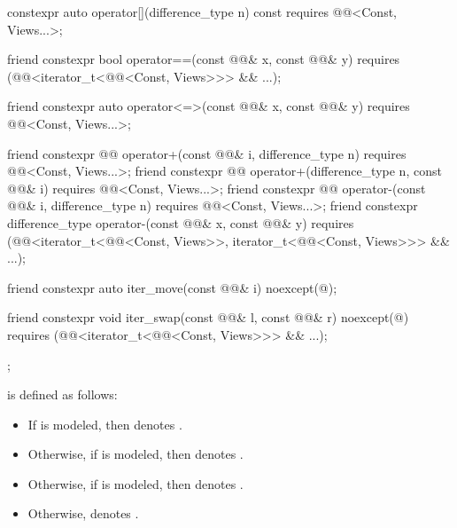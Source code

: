 \begin{codeblock}
{{    constexpr auto operator[](difference_type n) const
      requires @@<Const, Views...>;

    friend constexpr bool operator==(const @@& x, const @@& y)
      requires (@@<iterator_t<@@<Const, Views>>> && ...);

    friend constexpr auto operator<=>(const @@& x, const @@& y)
      requires @@<Const, Views...>;

    friend constexpr @@ operator+(const @@& i, difference_type n)
      requires @@<Const, Views...>;
    friend constexpr @@ operator+(difference_type n, const @@& i)
      requires @@<Const, Views...>;
    friend constexpr @@ operator-(const @@& i, difference_type n)
      requires @@<Const, Views...>;
    friend constexpr difference_type operator-(const @@& x, const @@& y)
      requires (@@<iterator_t<@@<Const, Views>>,
                                   iterator_t<@@<Const, Views>>> && ...);

    friend constexpr auto iter_move(const @@& i) noexcept(@\seebelow@);

    friend constexpr void iter_swap(const @@& l, const @@& r) noexcept(@\seebelow@)
      requires (@@<iterator_t<@@<Const, Views>>> && ...);
  };
}
\end{codeblock}

\pnum
{} is defined as follows:
\begin{itemize}
\item
If  is modeled,
then  denotes .
\item
Otherwise,
if  is modeled,
then  denotes .
\item
Otherwise,
if  is modeled,
then  denotes .
\item
Otherwise,  denotes .
\end{itemize}

